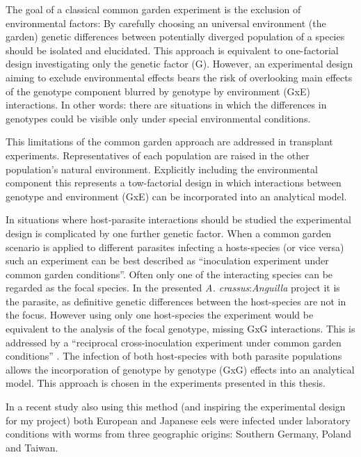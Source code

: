 The goal of a classical common garden experiment is the exclusion of
environmental factors: By carefully choosing an universal environment
(the garden) genetic differences between potentially diverged
population of a species should be isolated and elucidated. This
approach is equivalent to one-factorial design investigating only the
genetic factor (G). However, an experimental design aiming to exclude
environmental effects bears the risk of overlooking main effects of
the genotype component blurred by genotype by environment (GxE)
interactions. In other words: there are situations in which the
differences in genotypes could be visible only under special
environmental conditions.

This limitations of the common garden approach are addressed in
transplant experiments. Representatives of each population are raised
in the other population's natural environment. Explicitly including
the environmental component this represents a tow-factorial design in
which interactions between genotype and environment (GxE) can be
incorporated into an analytical model.

In situations where host-parasite interactions should be studied the
experimental design is complicated by one further genetic factor.
When a common garden scenario is applied to different parasites
infecting a hosts-species (or vice versa) such an experiment can be
best described as ``inoculation experiment under common garden
conditions''. Often only one of the interacting species can be
regarded as the focal species. In the presented
\textit{A. crassus}:\textit{Anguilla} project it is the parasite, as
definitive genetic differences between the host-species are not in the
focus. However using only one host-species the experiment would be
equivalent to the analysis of the focal genotype, missing GxG
interactions. This is addressed by a ``reciprocal cross-inoculation
experiment under common garden conditions'' \cite{kaltz_shykoff_rev}.
The infection of both host-species with both parasite populations
allows the incorporation of genotype by genotype (GxG) effects into
an analytical model. This approach is chosen in the experiments
presented in this thesis.

In a recent study also using this method (and inspiring the
experimental design for my project) both European and Japanese eels
were infected under laboratory conditions with worms from three
geographic origins: Southern Germany, Poland and Taiwan.


